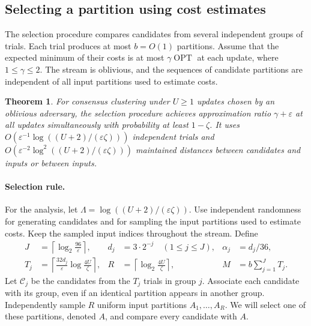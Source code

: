 \documentclass[11pt]{article}
\newtheorem{theorem}{Theorem}[section]
\newcommand{\OPT}{\operatorname{OPT}}
\begin{document}
\subsection{Selecting a partition using cost estimates}
\label{sec:ms}

The selection procedure compares candidates from several independent groups of
trials. Each trial produces at most $b=O(1)$ partitions. Assume that
the expected minimum of their costs is at most $\gamma\OPT$ at each
update, where $1\le\gamma\le2$. The stream is oblivious, and the
sequences of candidate partitions are independent of all input partitions used to estimate costs.

\begin{theorem}
\label{thm:ms-selection}
For consensus clustering under $U\ge1$ updates chosen by an oblivious
adversary, the selection procedure achieves approximation ratio $\gamma+\varepsilon$
at all updates simultaneously with probability at least $1-\zeta$.
It uses $O(\varepsilon^{-1}\log((U+2)/(\varepsilon\zeta)))$ independent
trials and $O(\varepsilon^{-2}\log^2((U+2)/(\varepsilon\zeta)))$
maintained distances between candidates and inputs or between inputs.
\end{theorem}

\paragraph{Selection rule.}

For the analysis, let $\Lambda=\log((U+2)/(\varepsilon\zeta))$.
Use independent randomness for generating candidates and for sampling
the input partitions used to estimate costs.
Keep the sampled input indices throughout the stream. Define
\begin{align*}
 J&=\left\lceil\log_2\frac{96}{\varepsilon}\right\rceil,
 &d_j&=3\cdot2^{-j}\quad(1\le j\le J),
 &\alpha_j&=d_j/36,\\
 T_j&=\left\lceil\frac{32d_j}{\varepsilon}
                         \log\frac{4U}{\zeta}\right\rceil,
 &R&=\left\lceil\log_2\frac{4U}{\zeta}\right\rceil,
 &M&=b\sum_{j=1}^JT_j.
\end{align*}
Let $\mathcal C_j$ be the candidates from the $T_j$ trials in group
$j$. Associate each candidate with its group, even if an identical
partition appears in another group. Independently sample $R$ uniform
input partitions $A_1,\ldots,A_R$. We will select one of these
partitions, denoted $A$, and compare every candidate with $A$.
\end{document}
